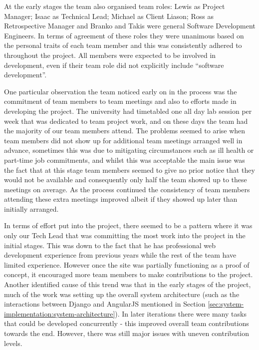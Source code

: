\documentclass{l3proj}
\begin{document}
At the early stages the team also organised team roles: Lewis as Project Manager; Isaac as Technical Lead; Michael as Client Liason; Ross as Retrospective Manager and Branko and Takis were general Software Development Engineers. In terms of agreement of these roles they were unanimous based on the personal traits of each team member and this was consistently adhered to throughout the project. All members were expected to be involved in development, even if their team role did not explicitly include ``software development''.

One particular observation the team noticed early on in the process was the commitment of team members to team meetings and also to efforts made in developing the project. The university had timetabled one all day lab session per week that was dedicated to team project work, and on these days the team had the majority of our team members attend. The problems seemed to arise when team members did not show up for additional team meetings arranged well in advance, sometimes this was due to mitigating circumstances such as ill health or part-time job commitments, and whilst this was acceptable the main issue was the fact that at this stage team members seemed to give no prior notice that they would not be available and consequently only half the team showed up to these meetings on average. As the process continued the consistency of team members attending these extra meetings improved albeit if they showed up later than initially arranged.

In terms of effort put into the project, there seemed to be a pattern where it was only our Tech Lead that was committing the most work into the project in the initial stages. This was down to the fact that he has professional web development experience from previous years while the rest of the team have limited experience. However once the site was partially functioning as a proof of concept, it encouraged more team members to make contributions to the project. Another identified cause of this trend was that in the early stages of the project, much of the work was setting up the overall system architecture (such as the interactions between Django and AngularJS mentioned in Section \ref{sec:system-implementation:system-architecture}). In later iterations there were many tasks that could be developed concurrently - this improved overall team contributions towards the end. However, there was still major issues with uneven contribution levels.

\end{document}
